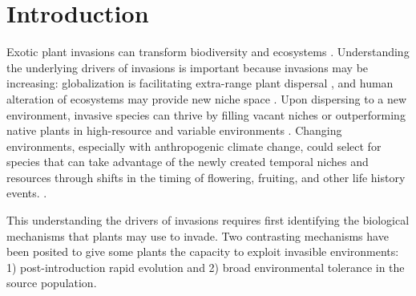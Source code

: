 \documentclass[12pt]{article}\usepackage[]{graphicx}\usepackage[]{color}
\begin{document}
	\section{Introduction} 
	Exotic plant invasions  can transform biodiversity and ecosystems \parencite{Bellard2016, Pejchar2009,Mack2000}.%
	 Understanding the underlying drivers of invasions is important because invasions may be increasing: globalization is facilitating extra-range plant dispersal \parencite{Helmus2014}, and human alteration of ecosystems may provide new niche space \parencite{Tilman2001, Blois2013,Inouye2008,Harte2015}. Upon dispersing to a new environment, invasive species can thrive by filling vacant niches \parencite{Elton1958} or outperforming native plants in high-resource and variable environments \parencite{Davis2001,Daehler2003}. Changing environments, especially with anthropogenic climate change, could select for species that can take advantage of the newly created temporal niches and resources through shifts in the timing of flowering, fruiting, and other life history events. \parencite{Franks2007}. 
	
	This understanding the drivers of invasions requires first identifying the biological mechanisms that plants may use to invade. Two contrasting mechanisms have been posited to give some plants the capacity to exploit invasible environments: 1) post-introduction rapid evolution and 2) broad environmental tolerance in the source population. 
\end{document}
